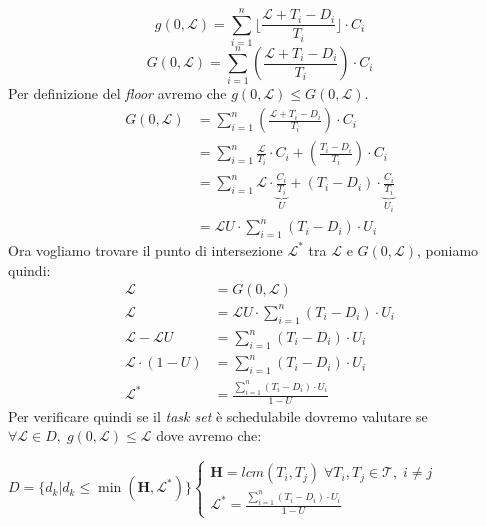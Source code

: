 \[g(0, \mathcal{L}) = \sum_{i=1}^n \lfloor \frac{\mathcal{L} + T_i - D_i}{T_i} \rfloor \cdot C_i\]
\[G(0, \mathcal{L}) = \sum_{i=1}^n (\frac{\mathcal{L} + T_i - D_i}{T_i})  \cdot C_i\]
Per definizione del \textit{floor} avremo che $g(0, \mathcal{L}) \leq G(0, \mathcal{L})$.
\begin{equation}
    \begin{alignedat}{2}
        G(0, \mathcal{L}) &= \sum_{i=1}^n (\frac{\mathcal{L} + T_i - D_i}{T_i}) \cdot C_i \\
        &= \sum_{i=1}^n \frac{\mathcal{L}}{T_i} \cdot C_i + (\frac{T_i - D_i}{T_i}) \cdot C_i \\
        &= \sum_{i=1}^n \mathcal{L} \cdot \underbrace{\frac{C_i}{T_i}}_{U} + (T_i - D_i) \cdot \underbrace{\frac{C_i}{T_i}}_{U_i} \\
        &= \mathcal{L}U \cdot \sum_{i=1}^n (T_i - D_i) \cdot U_i
    \end{alignedat}
\end{equation}
Ora vogliamo trovare il punto di intersezione $\mathcal{L}^*$ tra $\mathcal{L}$ e $G(0, \mathcal{L})$, poniamo quindi: 
\begin{equation}
    \begin{alignedat}{2}
        \mathcal{L} &= G(0, \mathcal{L}) \\
        \mathcal{L} &= \mathcal{L}U \cdot \sum_{i=1}^n (T_i - D_i) \cdot U_i \\
        \mathcal{L} - \mathcal{L}U &= \sum_{i=1}^n (T_i - D_i) \cdot U_i \\
        \mathcal{L} \cdot (1 - U) &= \sum_{i=1}^n (T_i - D_i) \cdot U_i \\
        \mathcal{L}^* &= \frac{\sum_{i=1}^n (T_i - D_i) \cdot U_i}{1 - U}
    \end{alignedat}
\end{equation}
Per verificare quindi se il \textit{task set} è schedulabile dovremo valutare se $\forall \mathcal{L} \in D, \; g(0, \mathcal{L}) \leq \mathcal{L}$ dove avremo che:
\begin{center}
    \begin{math}
        D = \{d_k | d_k \leq \min (\mathbf{H}, \mathcal{L}^*)\}
        \begin{cases}
            \mathbf{H} = lcm(T_i, T_j) \; \forall T_i,T_j \in \mathcal{T}, \; i \neq j \\
            \mathcal{L}^* = \frac{\sum_{i=1}^n (T_i - D_i) \cdot U_i}{1 - U}
        \end{cases}
    \end{math}
\end{center}
